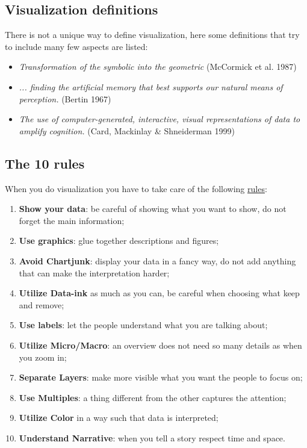 \subsection{Visualization definitions}

There is not a unique way to define visualization, here some definitions that try to include many few aspects are listed:

\begin{itemize}
\item \emph{Transformation of the symbolic into the geometric} (McCormick et al. 1987) 
\item \emph{... finding the artificial memory that best supports our natural means of perception.} (Bertin 1967)
\item \emph{The use of computer-generated, interactive, visual representations of data to amplify cognition.} (Card, Mackinlay \& Shneiderman 1999) 
\end{itemize}

\subsection*{The 10 rules}

When you do visualization you have to take care of the following \href{http://www.sealthreinhold.com/school/tuftes-rules/}{rules}:

\begin{enumerate}
\item \textbf{Show your data}: be careful of showing what you want to show, do not forget the main information;
\item \textbf{Use graphics}: glue together descriptions and figures;
\item \textbf{Avoid Chartjunk}: display your data in a fancy way, do not add anything that can make the interpretation harder;
\item \textbf{Utilize Data-ink} as much as you can, be careful when choosing what keep and remove;
\item \textbf{Use labels}: let the people understand what you are talking about;
\item \textbf{Utilize Micro/Macro}: an overview does not need so many details as when you zoom in;
\item \textbf{Separate Layers}: make more visible what you want the people to focus on;
\item \textbf{Use Multiples}: a thing different from the other captures the attention;
\item \textbf{Utilize Color} in a way such that data is interpreted;
\item \textbf{Understand Narrative}: when you tell a story respect time and space.
\end{enumerate}

